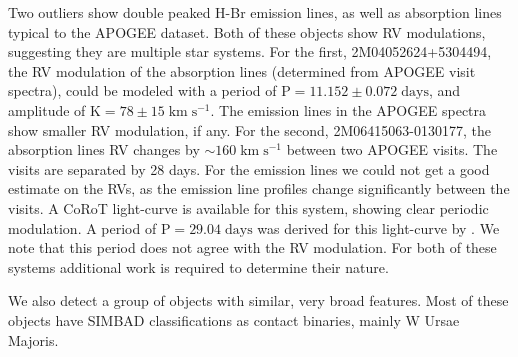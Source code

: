 \documentclass[fleqn,usenatbib]{mnras}
\begin{document}
Two outliers show double peaked H-Br emission lines, as well as absorption lines typical to the APOGEE dataset. Both of these objects show RV modulations, suggesting they are multiple star systems. For the first, 2M04052624+5304494, the RV modulation of the absorption lines (determined from APOGEE visit spectra), could be modeled with a period of $\mathrm{P} = 11.152 \pm 0.072 \; \mathrm{days}$, and amplitude of $\mathrm{K} = 78 \pm 15 \;  \mathrm{km} \; \mathrm{s}^{-1}$. The emission lines in the APOGEE spectra show smaller RV modulation, if any.
For the second, 2M06415063-0130177, the absorption lines RV changes by $\sim 160 \; \mathrm{km} \; \mathrm{s}^{-1}$ between two APOGEE visits. The visits are separated by 28 days. For the emission lines we could not get a good estimate on the RVs, as the emission line profiles change significantly between the visits. A CoRoT light-curve is available for this system, showing clear periodic modulation. A period of $\mathrm{P} = 29.04 \; \mathrm{days}$ was derived for this light-curve by \citet{affer12}. We note that this period does not agree with the RV modulation. For both of these systems additional work is required to determine their nature. 

We also detect a group of objects with similar, very broad features. Most of these objects have SIMBAD classifications as contact binaries, mainly W Ursae Majoris.



\end{document}
